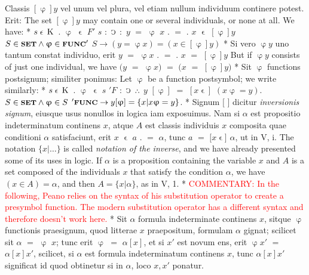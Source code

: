 \documentclass{book}
\newcommand{\C}{\mathop{\sbox0{$\displaystyle$$\reflectbox{C}$} %
\raisebox{-\height+\ht0-0.05cm}[\ht0][\dp0]{\scalebox{0.8}[0.8]{\copy0}}}\displaylimits} %
\newcommand{\pppNoSpace}{\leavevmode\lower0ex\hbox{.}\kern-0.1em\raise0.7ex\hbox{.}\kern-0.1em\lower0ex\hbox{.}} %
\newcommand{\smallIn}{\ensuremath{\mathrel{\epsilon}}}
\newcommand{\K}{\mathop{\thinspace \text{K} \thinspace}}
\newcommand{\setOfSets}{\mathord{\text{{\footnotesize \textbf{SET}}}}}
\newcommand{\func}{\mathord{\text{{\footnotesize \textbf{FUNC}}}}}
\newcommand\commentary[1]{\textcolor{red}{COMMENTARY: #1}}
\newenvironment{translateTwoCol}
               { %
                 \columnratio{0.5, 0.5} \begin{paracol}{2}
                 \newcommand{\LAT}{\switchcolumn[0]*}
                 \newcommand{\ENG}{\switchcolumn[1]}
               }
               { %
                 \let\ENG\undefined
                 \let\LAT\undefined
                 \end{paracol}
               }
\begin{document}
\begin{translateTwoCol}
Classis $[\upvarphi] y$ vel unum vel plura, vel etiam nullum individuum continere potest. Erit:
\ENG
The set $[\upvarphi] y$ may contain one or several individuals, or none at all. We have:
\LAT
\hspace{1.06cm} $s \smallIn \K$ $.$ $\upvarphi$ $\smallIn$ $F'$ $s$ $:$ $\C$ $:$ $y$ $=$ $\upvarphi$ $x$ $.$ $=$ $.$ $x$ $\smallIn$ $[\upvarphi] y$
\ENG
\hspace{1.06cm} $S \in \setOfSets \wedge \upvarphi \in \func'$ $S \rightarrow (y = \upvarphi x)=(x \in [\upvarphi] y)$
\LAT
Si vero $\upvarphi y$ uno tantum constat individuo, erit $y$ $=$ $\upvarphi x$ $.$ $=$ $.$ $x$ $=$ $[\upvarphi] y$
\ENG
But if $\upvarphi y$ consists of just one individual, we have $(y$ $=$ $\upvarphi x)$ $=$ $(x$ $=$ $[\upvarphi] y)$
\LAT
Sit $\upvarphi$ functions postsignum; similiter ponimus:
\ENG
Let $\upvarphi$ be a function postsymbol; we write similarly:
\LAT
\hspace{1.06cm} $s \smallIn \K$ $.$ $\upvarphi$ $\smallIn$ $s$ $'F$ $:$ $\C$ $\pppNoSpace$ $y$ $[ \upvarphi ]$ $=$ $[ x\smallIn ]$ $(x \upvarphi = y)$.  %
\ENG
\hspace{1.06cm} $S \in \setOfSets \wedge \upvarphi \in S$ $'\func \rightarrow y [ \upvarphi ] = \{ x | x \upvarphi = y\}$.
\LAT
Signum $[$ $]$ dicitur \emph{inversionis signum}, eiusque usus nonullos in logica iam exposuimus. Nam si $\alpha$ est propositio indeterminatum continens $x$, atque $A$ est classis individuis $x$ composita quae conditioni $\alpha$ satisfaciunt, erit $x$ $\smallIn$ $a$ $.$ $=$ $\alpha$, tunc $a$ $=$ $[x$\smallIn$]$ $\alpha$, ut in V, i.
\ENG
The notation $\{ x | \ldots \}$ is called \emph{notation of the inverse}, and we have already presented some of its uses in logic. If $\alpha$ is a proposition containing the variable $x$ and $A$ is a set composed of the individuals $x$ that satisfy the condition $\alpha$, we have $(x \in A) = \alpha$, and then $A = \{ x | \alpha \}$, as in V, 1. %
\LAT
\ENG
\commentary{In the following, Peano relies on the syntax of his substitution operator to create a presymbol function.  The modern substitution operator has a different syntax and therefore doesn't work here.}
\LAT
Sit $\alpha$ formula indeterminate continens $x$, sitque $\upvarphi$ functionis praesignum, quod litterae $x$ praepositum, formulam $\alpha$ gignat; scilicet sit $\alpha$ $=$ $\upvarphi$ $x$; tunc erit $\upvarphi$ $=$ $\alpha [x]$, et si $x'$ est novum ens, erit $\upvarphi x'$ $=$ $\alpha [x] x'$, scilicet, si $\alpha$ est formula indeterminatum continens $x$, tunc $\alpha [x] x'$ significat id quod obtinetur si in $\alpha$, loco $x, x'$ ponatur.

\end{translateTwoCol}
\end{document}
